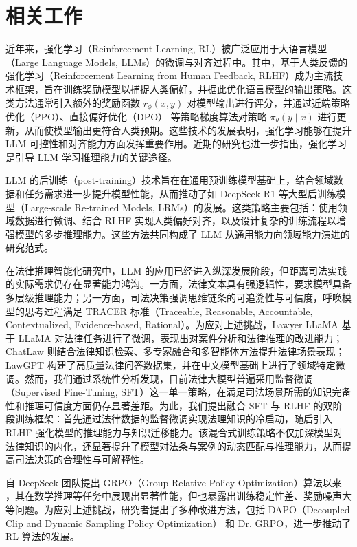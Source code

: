\documentclass{article}
\newcommand{\deepseekr}{DeepSeek-R1}
\newcommand{\deepseekr}{DeepSeek-R1}
\begin{document}
\section{相关工作}

近年来，强化学习（Reinforcement Learning, RL）被广泛应用于大语言模型（Large Language Models, LLMs）的微调与对齐过程中。其中，基于人类反馈的强化学习（Reinforcement Learning from Human Feedback, RLHF）成为主流技术框架，旨在训练奖励模型以捕捉人类偏好，并据此优化语言模型的输出策略。这类方法通常引入额外的奖励函数 $r_{\phi}(x, y)$ 对模型输出进行评分，并通过近端策略优化（PPO）\cite{schulman2017proximal}、直接偏好优化（DPO）\cite{rafailov2023direct} 等策略梯度算法对策略 $\pi_{\theta}(y \mid x)$ 进行更新，从而使模型输出更符合人类预期。这些技术的发展表明，强化学习能够在提升 LLM 可控性和对齐能力方面发挥重要作用。近期的研究也进一步指出，强化学习是引导 LLM 学习推理能力的关键途径。

LLM 的后训练（post-training）技术旨在在通用预训练模型基础上，结合领域数据和任务需求进一步提升模型性能，从而推动了如 \deepseekr \cite{guo2025deepseek} 等大型后训练模型（Large-scale Re-trained Models, LRMs）的发展。这类策略主要包括：使用领域数据进行微调、结合 RLHF 实现人类偏好对齐，以及设计复杂的训练流程以增强模型的多步推理能力。这些方法共同构成了 LLM 从通用能力向领域能力演进的研究范式。

在法律推理智能化研究中，LLM 的应用已经进入纵深发展阶段，但距离司法实践的实际需求仍存在显著能力鸿沟。一方面，法律文本具有强逻辑性，要求模型具备多层级推理能力；另一方面，司法决策强调思维链条的可追溯性与可信度，呼唤模型的思考过程满足 TRACER 标准（Traceable, Reasonable, Accountable, Contextualized, Evidence-based, Rational）。为应对上述挑战，Lawyer LLaMA\cite{huang2023lawyer} 基于 LLaMA 对法律任务进行了微调，表现出对案件分析和法律推理的改进能力；ChatLaw\cite{cui2023chatlaw} 则结合法律知识检索、多专家融合和多智能体方法提升法律场景表现；LawGPT\cite{zhou2024lawgpt} 构建了高质量法律问答数据集，并在中文模型基础上进行了领域特定微调。然而，我们通过系统性分析发现，目前法律大模型普遍采用监督微调（Supervised Fine-Tuning, SFT）这一单一策略，在满足司法场景所需的知识完备性和推理可信度方面仍存显著差距。为此，我们提出融合 SFT 与 RLHF 的双阶段训练框架：首先通过法律数据的监督微调实现法理知识的冷启动，随后引入 RLHF 强化模型的推理能力与知识迁移能力。该混合式训练策略不仅加深模型对法律知识的内化，还显著提升了模型对法条与案例的动态匹配与推理能力，从而提高司法决策的合理性与可解释性。

自 DeepSeek 团队提出 GRPO（Group Relative Policy Optimization）算法以来 \cite{shao2024deepseekmath}，其在数学推理等任务中展现出显著性能，但也暴露出训练稳定性差、奖励噪声大等问题。为应对上述挑战，研究者提出了多种改进方法，包括 DAPO（Decoupled Clip and Dynamic Sampling Policy Optimization）\cite{yu2025dapo} 和 Dr. GRPO\cite{liu2025understanding}，进一步推动了 RL 算法的发展。
\end{document}
